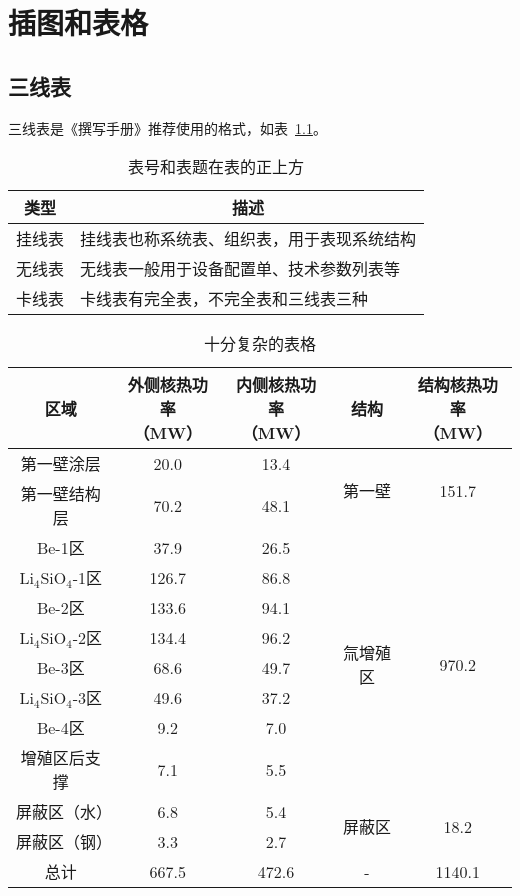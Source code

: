 
\chapter{插图和表格}

\section{三线表}

三线表是《撰写手册》推荐使用的格式，如表~\ref{tab:exampletable}。

\begin{table}
  \centering
  \caption{表号和表题在表的正上方}
  \label{tab:exampletable}
  \begin{tabular}{cl}
    \toprule
    类型   & \multicolumn{1}{c}{描述}               \\
    \midrule
    挂线表 & 挂线表也称系统表、组织表，用于表现系统结构 \\
    无线表 & 无线表一般用于设备配置单、技术参数列表等   \\
    卡线表 & 卡线表有完全表，不完全表和三线表三种       \\
    \bottomrule
  \end{tabular}
\end{table}

\begin{table}[h] %
	\centering
	\caption{十分复杂的表格}
	\begin{tabular}{*{5}{c}}
		\toprule
		区域 & \tabincell{c}{外侧核热功率\\（MW）} & \tabincell{c}{内侧核热功率\\（MW）} & 结构 & \tabincell{c}{结构核热功率\\（MW）} \\
		\midrule
		第一壁涂层 & 20.0 & 13.4 & \multirow{2}{*}{第一壁} & \multirow{2}{*}{151.7} \\
		第一壁结构层 & 70.2 & 48.1 & ~ & ~ \\
		\midrule
		Be-1区 & 37.9 & 26.5 & \multirow{8}{*}{氚增殖区} & \multirow{8}{*}{970.2} \\ 
		Li$ _{\text{4}} $SiO$ _{\text{4}} $-1区 & 126.7 & 86.8 & ~ & ~ \\
		Be-2区 & 133.6 & 94.1 & ~ & ~ \\
		Li$ _{\text{4}} $SiO$ _{\text{4}} $-2区 & 134.4 & 96.2 & ~ & ~ \\
		Be-3区 & 68.6 & 49.7 & ~ & ~ \\
		Li$ _{\text{4}} $SiO$ _{\text{4}} $-3区 & 49.6 & 37.2 & ~ & ~ \\
		Be-4区 & 9.2 & 7.0 & ~ & ~ \\
		增殖区后支撑 & 7.1 & 5.5 & ~ & ~ \\
		\midrule
		屏蔽区（水） & 6.8 & 5.4 & \multirow{2}{*}{屏蔽区} & \multirow{2}{*}{18.2} \\
		屏蔽区（钢） & 3.3 & 2.7 & ~ & ~ \\
		\midrule
		总计 & 667.5 & 472.6 & - & 1140.1 \\
		\bottomrule
	\end{tabular}
	\label{nucheat_tot}
\end{table}


